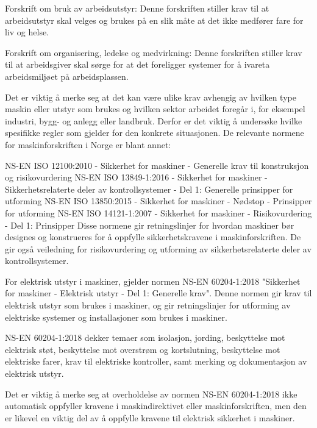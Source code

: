\documentclass[aspectratio=169,xcolor=dvipsnames]{beamer}
\begin{document}
\begin{frame}
\begin{itemize}
{Forskrift om bruk av arbeidsutstyr: Denne forskriften stiller krav til at arbeidsutstyr skal velges og brukes på en slik måte at det ikke medfører fare for liv og helse.

Forskrift om organisering, ledelse og medvirkning: Denne forskriften stiller krav til at arbeidsgiver skal sørge for at det foreligger systemer for å ivareta arbeidsmiljøet på arbeidsplassen.

		Det er viktig å merke seg at det kan være ulike krav avhengig av hvilken type maskin eller utstyr som brukes og hvilken sektor arbeidet foregår i, for eksempel industri, bygg- og anlegg eller landbruk. Derfor er det viktig å undersøke hvilke spesifikke regler som gjelder for den konkrete situasjonen.
De relevante normene for maskinforskriften i Norge er blant annet:

NS-EN ISO 12100:2010 - Sikkerhet for maskiner - Generelle krav til konstruksjon og risikovurdering
NS-EN ISO 13849-1:2016 - Sikkerhet for maskiner - Sikkerhetsrelaterte deler av kontrollsystemer - Del 1: Generelle prinsipper for utforming
NS-EN ISO 13850:2015 - Sikkerhet for maskiner - Nødstop - Prinsipper for utforming
NS-EN ISO 14121-1:2007 - Sikkerhet for maskiner - Risikovurdering - Del 1: Prinsipper
Disse normene gir retningslinjer for hvordan maskiner bør designes og konstrueres for å oppfylle sikkerhetskravene i maskinforskriften. De gir også veiledning for risikovurdering og utforming av sikkerhetsrelaterte deler av kontrollsystemer.

For elektrisk utstyr i maskiner, gjelder normen NS-EN 60204-1:2018 "Sikkerhet for maskiner - Elektrisk utstyr - Del 1: Generelle krav". Denne normen gir krav til elektrisk utstyr som brukes i maskiner, og gir retningslinjer for utforming av elektriske systemer og installasjoner som brukes i maskiner.

NS-EN 60204-1:2018 dekker temaer som isolasjon, jording, beskyttelse mot elektrisk støt, beskyttelse mot overstrøm og kortslutning, beskyttelse mot elektriske farer, krav til elektriske kontroller, samt merking og dokumentasjon av elektrisk utstyr.

Det er viktig å merke seg at overholdelse av normen NS-EN 60204-1:2018 ikke automatisk oppfyller kravene i maskindirektivet eller maskinforskriften, men den er likevel en viktig del av å oppfylle kravene til elektrisk sikkerhet i maskiner.
		}
\end{itemize}
\end{frame}
\end{document}
